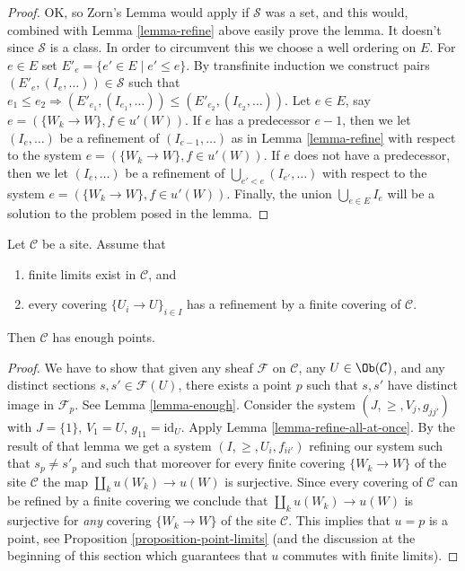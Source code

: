 \begin{proof}
\medskip\noindent
OK, so Zorn's Lemma would apply if $\mathcal{S}$ was a set,
and this would, combined with Lemma \ref{lemma-refine} above easily prove
the lemma. It doesn't since $\mathcal{S}$ is a class. In order
to circumvent this we choose a well ordering on $E$.
For $e \in E$ set $E'_e = \{e' \in E \mid e' \leq e\}$.
By transfinite induction we construct pairs
$(E'_e, (I_e, \ldots)) \in \mathcal{S}$ such that
$e_1 \leq e_2 \Rightarrow (E'_{e_1}, (I_{e_1}, \ldots))
\leq (E'_{e_2}, (I_{e_2}, \ldots))$.
Let $e \in E$, say $e = (\{W_k \to W\}, f\in u'(W))$.
If $e$ has a predecessor $e - 1$, then we let
$(I_e, \ldots)$ be a refinement of $(I_{e - 1}, \ldots)$
as in Lemma \ref{lemma-refine} with respect to the system
$e = (\{W_k \to W\}, f\in u'(W))$.
If $e$ does not have a predecessor, then we let
$(I_e, \ldots)$ be a refinement of $\bigcup_{e' < e} (I_{e'}, \ldots)$
with respect to the system
$e = (\{W_k \to W\}, f\in u'(W))$.
Finally, the union $\bigcup_{e \in E} I_e$ will be a solution to
the problem posed in the lemma.
\end{proof}

\begin{proposition}
\label{proposition-criterion-points}
Let $\mathcal{C}$ be a site. Assume that
\begin{enumerate}
\item finite limits exist in $\mathcal{C}$, and
\item every covering $\{U_i \to U\}_{i \in I}$
has a refinement by a finite covering of $\mathcal{C}$.
\end{enumerate}
Then $\mathcal{C}$ has enough points.
\end{proposition}

\begin{proof}
We have to show that given any sheaf
$\mathcal{F}$ on $\mathcal{C}$, any $U \in \Ob(\mathcal{C})$,
and any distinct sections $s, s' \in \mathcal{F}(U)$, there exists
a point $p$ such that $s, s'$ have distinct image in
$\mathcal{F}_p$. See Lemma \ref{lemma-enough}.
Consider the system $(J, \geq, V_j, g_{jj'})$
with $J = \{1\}$, $V_1 = U$, $g_{11} = \text{id}_U$.
Apply Lemma \ref{lemma-refine-all-at-once}.
By the result of that lemma we get a system
$(I, \geq, U_i, f_{ii'})$ refining our system such
that $s_p \not = s'_p$ and such that moreover for every
finite covering $\{W_k \to W\}$ of the site $\mathcal{C}$ the map
$\coprod_k u(W_k) \to u(W)$ is surjective.
Since every covering of $\mathcal{C}$ can be refined by
a finite covering we conclude that
$\coprod_k u(W_k) \to u(W)$ is surjective for {\it any}
covering $\{W_k \to W\}$ of the site $\mathcal{C}$.
This implies that $u = p$ is a point, see
Proposition \ref{proposition-point-limits} (and the discussion
at the beginning of this section which guarantees that $u$
commutes with finite limits).
\end{proof}

